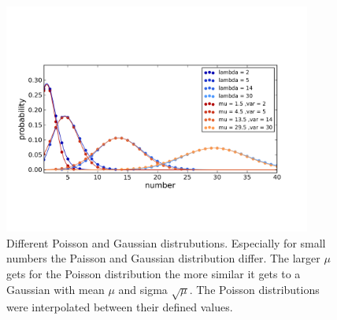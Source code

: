 \begin{figure}
\centering
\includegraphics[width = 0.9\textwidth]{pictures/poissgaussdistr.png}
	\caption{Different Poisson and Gaussian distrubutions. Especially for small numbers the Paisson and Gaussian distribution differ. The larger $\mu$ gets for the Poisson distribution the more similar it gets to a Gaussian with mean $\mu$ and sigma $\sqrt{\mu}$. The Poisson distributions were interpolated between their defined values.}
	\label{poisgaussdistr}
\end{figure}

